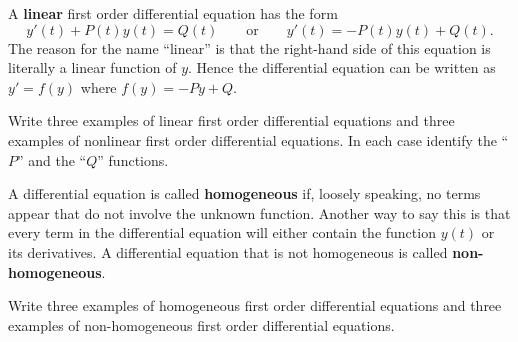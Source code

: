 \begin{definition}
    A {\bf linear} first order differential equation has the form
    \[ y'(t) + P(t) y(t) = Q(t) \qquad \text{or} \qquad y'(t) = -P(t) y(t) + Q(t). \]
    The reason for the name ``linear'' is that the right-hand side of this equation is
    literally a linear function of $y$.  Hence the differential equation can be written as
    $y' = f(y)$ where $f(y) = -Py + Q.$
\end{definition}
\begin{problem}
    Write three examples of linear first order differential equations and three
    examples of nonlinear first order differential equations.  In each case identify the
    ``$P$'' and the ``$Q$'' functions.
\end{problem}

\begin{definition}
    A differential equation is called {\bf homogeneous} if, loosely speaking, no terms appear
    that do not involve the unknown function.  Another way to say this is that every term
    in the differential equation will either contain the function $y(t)$ or its
    derivatives.  A differential equation that is not homogeneous is called {\bf
    non-homogeneous}.
\end{definition}
\begin{problem}
    Write three examples of homogeneous first order differential equations and three
    examples of non-homogeneous first order differential equations.
\end{problem}

